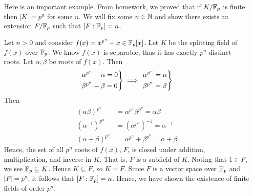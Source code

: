 \begin{example}
    Here is an important example. From homework, we proved that if $K/\mathbb{F}_p$ is finite then $|K| = p^n$ for some $n$. We will fix some $n \in \mathbb{N}$ and show there exists an extension $F/ \mathbb{F}_p$ such that $[F : \mathbb{F}_p] = n$.

    Let $n > 0$ and consider $f(x) = x^{p^n} - x \in \mathbb{F}_p[x]$. Let $K$ be the splitting field of $f(x)$ over $\mathbb{F}_p$. We know $f(x)$ is separable, thus it has exactly $p^n$ distinct roots. Let $\alpha, \beta$ be roots of $f(x)$. Then
    \begin{align*}
        \begin{rcases*}
            \alpha^{p^n}-\alpha = 0 \\
            \beta^{p^n}-\beta = 0
        \end{rcases*} \implies
        \begin{rcases*}
            \alpha^{p^n} = \alpha \\
            \beta^{p^n} = \beta
        \end{rcases*}
    \end{align*}
    Then
    \begin{align*}
        (\alpha \beta)^{p^n} &= \alpha^{p^n}\beta^{p^n} = \alpha \beta \\
        (\alpha^{-1})^{p^n} &= (\alpha^{p^n})^{-1} = \alpha^{-1} \\
        (\alpha + \beta)^{p^n} &= \alpha^{p^n} + \beta^{p^n} = \alpha + \beta
    \end{align*}
    Hence, the set of all $p^n$ roots of $f(x)$, $F$, is closed under addition, multiplication, and inverse in $K$. That is, $F$ is a subfield of $K$. Noting that $1\in F$, we see $\mathbb{F}_p \subseteq K$. Hence $K \subseteq F$, so $K=F$. Since $F$ is a vector space over $\mathbb{F}_p$ and $|F| = p^n$, it follows that $[F : \mathbb{F}_p] = n$. Hence, we have shown the existence of finite fields of order $p^n$.
\end{example}